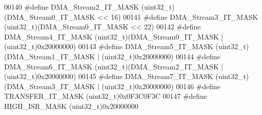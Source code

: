 \begin{DoxyCode}
00140 \textcolor{preprocessor}{#}\textcolor{preprocessor}{define} \textcolor{preprocessor}{DMA\_Stream2\_IT\_MASK}     \textcolor{preprocessor}{(}\textcolor{preprocessor}{uint32\_t}\textcolor{preprocessor}{)}\textcolor{preprocessor}{(}DMA_Stream0_IT_MASK \textcolor{preprocessor}{<<} 16\textcolor{preprocessor}{)}
00141 \textcolor{preprocessor}{#}\textcolor{preprocessor}{define} \textcolor{preprocessor}{DMA\_Stream3\_IT\_MASK}     \textcolor{preprocessor}{(}\textcolor{preprocessor}{uint32\_t}\textcolor{preprocessor}{)}\textcolor{preprocessor}{(}DMA_Stream0_IT_MASK \textcolor{preprocessor}{<<} 22\textcolor{preprocessor}{)}
00142 \textcolor{preprocessor}{#}\textcolor{preprocessor}{define} \textcolor{preprocessor}{DMA\_Stream4\_IT\_MASK}     \textcolor{preprocessor}{(}\textcolor{preprocessor}{uint32\_t}\textcolor{preprocessor}{)}\textcolor{preprocessor}{(}DMA_Stream0_IT_MASK \textcolor{preprocessor}{|} \textcolor{preprocessor}{(}\textcolor{preprocessor}{uint32\_t}\textcolor{preprocessor}{)}0x20000000\textcolor{preprocessor}{)}
00143 \textcolor{preprocessor}{#}\textcolor{preprocessor}{define} \textcolor{preprocessor}{DMA\_Stream5\_IT\_MASK}     \textcolor{preprocessor}{(}\textcolor{preprocessor}{uint32\_t}\textcolor{preprocessor}{)}\textcolor{preprocessor}{(}DMA_Stream1_IT_MASK \textcolor{preprocessor}{|} \textcolor{preprocessor}{(}\textcolor{preprocessor}{uint32\_t}\textcolor{preprocessor}{)}0x20000000\textcolor{preprocessor}{)}
00144 \textcolor{preprocessor}{#}\textcolor{preprocessor}{define} \textcolor{preprocessor}{DMA\_Stream6\_IT\_MASK}     \textcolor{preprocessor}{(}\textcolor{preprocessor}{uint32\_t}\textcolor{preprocessor}{)}\textcolor{preprocessor}{(}DMA_Stream2_IT_MASK \textcolor{preprocessor}{|} \textcolor{preprocessor}{(}\textcolor{preprocessor}{uint32\_t}\textcolor{preprocessor}{)}0x20000000\textcolor{preprocessor}{)}
00145 \textcolor{preprocessor}{#}\textcolor{preprocessor}{define} \textcolor{preprocessor}{DMA\_Stream7\_IT\_MASK}     \textcolor{preprocessor}{(}\textcolor{preprocessor}{uint32\_t}\textcolor{preprocessor}{)}\textcolor{preprocessor}{(}DMA_Stream3_IT_MASK \textcolor{preprocessor}{|} \textcolor{preprocessor}{(}\textcolor{preprocessor}{uint32\_t}\textcolor{preprocessor}{)}0x20000000\textcolor{preprocessor}{)}
00146 \textcolor{preprocessor}{#}\textcolor{preprocessor}{define} \textcolor{preprocessor}{TRANSFER\_IT\_MASK}        \textcolor{preprocessor}{(}\textcolor{preprocessor}{uint32\_t}\textcolor{preprocessor}{)}0x0F3C0F3C
00147 \textcolor{preprocessor}{#}\textcolor{preprocessor}{define} \textcolor{preprocessor}{HIGH\_ISR\_MASK}           \textcolor{preprocessor}{(}\textcolor{preprocessor}{uint32\_t}\textcolor{preprocessor}{)}0x20000000

\end{DoxyCode}
